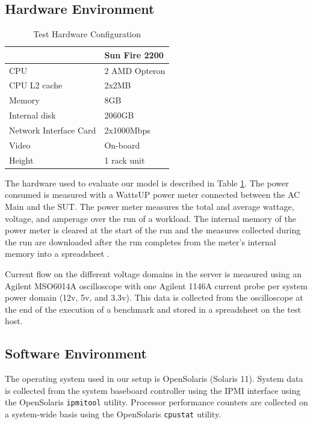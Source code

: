 \documentclass[12pt,onecolumn]{ULieeetran}
\begin{document}
\subsection{Hardware Environment}
\label{sec:hwenv}
\begin{table}
  \centering
  \label{tab:hardware}
  \caption{Test Hardware Configuration}
  \begin{tabular}{l|l}
    \hline
    &\textbf{Sun Fire 2200}\\  
    \hline 
    CPU&2 AMD Opteron\\
    CPU L2 cache&2x2MB\\
    Memory&8GB\\
    Internal disk&2060GB\\
    Network Interface Card&2x1000Mbps\\
    Video&On-board \\
    Height&1 rack unit\\
    \hline \hline
  \end{tabular}
\end{table}
The hardware used to evaluate our model is described in Table
\ref{tab:hardware}. The power consumed is measured with a WattsUP
\cite{WattsUp2006a} power meter connected between the AC Main and the
SUT.  The power meter measures the total and average wattage, voltage,
and amperage over the run of a workload.  The internal memory of the
power meter is cleared at the start of the run and the measures
collected during the run are downloaded after the run completes from the
meter's internal memory into a spreadsheet \cite{WattsUp2006b}.

Current flow on the different voltage domains in the server is measured
using an Agilent MSO6014A oscilloscope with one Agilent 1146A current
probe per system power domain (12v, 5v, and 3.3v). This data is
collected from the oscilloscope at the end of the execution of a
benchmark and stored in a spreadsheet on the test host.

\subsection{Software Environment}
\label{sec:software}
The operating system used in our setup is OpenSolaris (Solaris
11). System data is collected from the system baseboard controller using
the IPMI interface using the OpenSolaris \texttt{ipmitool} utility. Processor
performance counters are collected on a system-wide basis using the
OpenSolaris \texttt{cpustat} utility.
\end{document}
